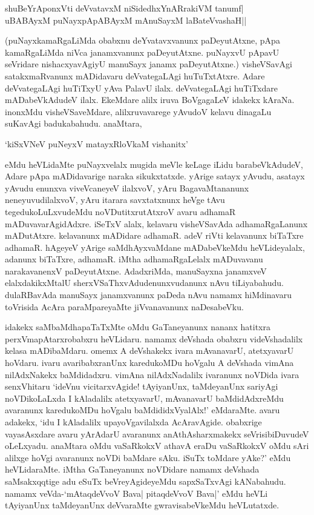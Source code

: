 \begin{shloka}
shuBeYrAponxVti deVvatavxM niSidedhxYnARrakiVM tanumf|\\
uBABAyxM puNayxpApABAyxM mAnuSayxM laBateV\s vashaH||
\end{shloka}

(puNayxkamaRgaLiMda obabxnu deYvatavxvanunx paDeyutAtxne, pApa kamaRgaLiMda niVca janamxvanunx paDeyutAtxne. puNayxvU pApavU seVridare nishacxyavAgiyU manuSayx janamx paDeyutAtxne.) visheVSavAgi satakxmaRvanunx mADidavaru deVvategaLAgi huTuTxtAtxre. Adare deVvategaLAgi huTiTxyU yAva PalavU ilalx. deVvategaLAgi huTiTxdare mADabeVkAdudeV ilalx. EkeMdare alilx iruva BoVgagaLeV idakekx kAraNa. inonxMdu visheVSaveMdare, alilxruvavarege yAvudoV kelavu dinagaLu suKavAgi badukabahudu. anaMtara,

\begin{shloka}
`kiSxVNeV puNeyxV matayxRloVkaM vishanitx'
\end{shloka}

eMdu heVLidaMte puNayxvelalx mugida meVle keLage iLidu barabeVkAdudeV, Adare pApa mADidavarige naraka sikukxtatxde. yArige satayx yAvudu, asatayx yAvudu enunxva viveVcaneyeV ilalxvoV, yAru BagavaMtananunx neneyuvudilalxvoV, yAru itarara savxtatxnunx heVge tAvu tegedukoLuLxvudeMdu noVDutitxrutAtxroV avaru adhamaR mADuvavarAgidAdxre. iSeTxV alalx, kelavaru visheVSavAda adhamaRgaLanunx mADutAtxre. kelavanunx mADidare adhamaR. adeV riVti kelavanunx biTaTxre adhamaR. hAgeyeV yArige saMdhAyxvaMdane mADabeVkeMdu heVLideyalalx, adanunx biTaTxre, adhamaR. iMtha adhamaRgaLelalx mADuvavanu narakavanenxV paDeyutAtxne. AdadxriMda, manuSayxna janamxveV elalxdakikxMtalU sherxVSaThxvAdudenunxvudanunx nAvu tiLiyabahudu. dulaRBavAda manuSayx janamxvanunx paDeda nAvu namamx hiMdinavaru toVrisida AcAra paraMpareyaMte jiVvanavanunx naDesabeVku.

idakekx saMbaMdhapaTaTxMte oMdu GaTaneyanunx nananx hatitxra perxVmapAtarxrobabxru heVLidaru. namamx deVshada obabxru videVshadalilx kelasa mADibaMdaru. omemx A deVshakekx ivara mAvanavarU, atetxyavarU hoVdaru. ivaru avaribabxranUnx karedukoMDu hoVgalu A deVshada vimAna nilAdxNakekx baMdidadxru. vimAna nilAdxNadalilx ivaranunx noVDida ivara senxVhitaru `ideVnu vicitarxvAgide! tAyiyanUnx, taMdeyanUnx sariyAgi noVDikoLaLxda I kAladalilx atetxyavarU, mAvanavarU baMdidAdxreMdu avaranunx karedukoMDu hoVgalu baMdididxVyalAlx!' eMdaraMte. avaru adakekx, `idu I kAladalilx upayoVgavilalxda AcAravAgide. obabxrige vayasAsxdare avaru yArAdarU avaranunx anAthAsharxmakekx seVrisibiDuvudeV oLeLxyadu. anaMtara oMdu vaSaRkokxV athavA eraDu vaSaRkokxV oMdu sAri alilxge hoVgi avaranunx noVDi baMdare sAku. iSuTx toMdare yAke?' eMdu heVLidaraMte. iMtha GaTaneyanunx noVDidare namamx deVshada saMsakxqqtige adu eSuTx beVreyAgideyeMdu sapxSaTxvAgi kANabahudu. namamx veVda-`mAtaqdeVvoV Bava| pitaqdeVvoV Bava|' eMdu heVLi tAyiyanUnx taMdeyanUnx deVvaraMte gwravisabeVkeMdu heVLutatxde.

